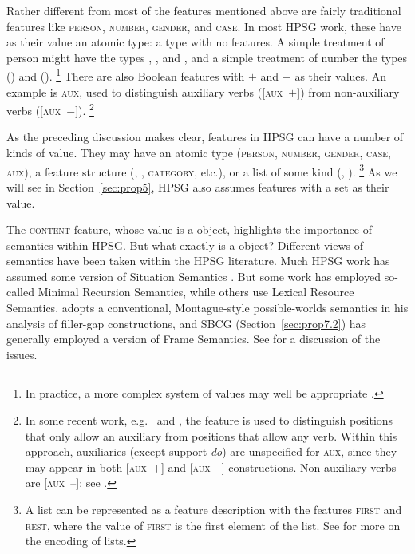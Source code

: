 \documentclass[output=paper
	        ,collection
	        ,collectionchapter
 	        ,biblatex
                ,babelshorthands
                ,newtxmath
                ,draftmode
                ,colorlinks, citecolor=brown
]{langscibook}
\begin{document}
Rather different from most of the features mentioned above are fairly traditional features like
\textsc{person, number, gender}, and \textsc{case}. In most HPSG work, these have as their value an
atomic type: a type with no features. A simple treatment of person might have the
types , , and , and a simple treatment of number the types
 () and  ().%
%
\footnote{In practice, a more complex system of values may well be appropriate \citep[Section~3]{Flickinger2000a}.}
%
There are also Boolean features with $+$ and $-$ as their values. An example is \textsc{aux}, used
to distinguish auxiliary verbs ([\textsc{aux}~$+$]) from non-auxiliary verbs ([\textsc{aux}~$-$]).%
%
\footnote{In some recent work, e.g.\ \citet[157--162]{Sag2012a} and \citet{Sag2020a}, the feature is
  used to distinguish positions that only allow an auxiliary from positions that allow any
  verb. Within this approach, auxiliaries (except support \emph{do}) are unspecified for
  \textsc{aux}, since they may appear in both [\textsc{aux}~$+$] and [\textsc{aux}~$–$]
  constructions. Non-auxiliary verbs are [\textsc{aux}~$–$]; see
  .} 
%

As the preceding discussion makes clear, features in HPSG can have a number of kinds of value. They
may have an atomic type (\textsc{person}, \textsc{number}, \textsc{gender}, \textsc{case},
\textsc{aux}), a feature structure (\synsem, \local, \textsc{category}, etc.), or a list of some
kind (\subj, \comps).%
%
\footnote{A list can be represented as a feature description with the features \textsc{first} and
  \textsc{rest}, where the value of \textsc{first} is the first element of the list. See
  \crossrefchapterw[\page \pageref{page-list-encoding}]{formal-background} for more on the encoding
  of lists.} 
%
As we will see in Section~\ref{sec:prop5}, HPSG also assumes features with a set as their value.

{\sloppypar
The \textsc{content} feature, whose value is a  object, highlights the importance of
semantics within HPSG. But what exactly is a  object? Different views of semantics
have been taken within the HPSG literature. Much HPSG work has assumed some version of Situation
Semantics \citep{BP83a}. But some work has employed so-called Minimal
Recursion Semantics\indexmrs \citep*{CFPS2005a}, while others use Lexical Resource
Semantics\indexlrs \citep{RS2004a-u}. \citet[501]{Sag2010b} adopts a
conventional, Montague-style possible-worlds semantics \citep{Montague74a-ed} in his analysis of
 filler-gap constructions, and SBCG (Section~\ref{sec:prop7.2}) has generally employed a
version of Frame Semantics. See  for a discussion of the issues.
}
\end{document}
